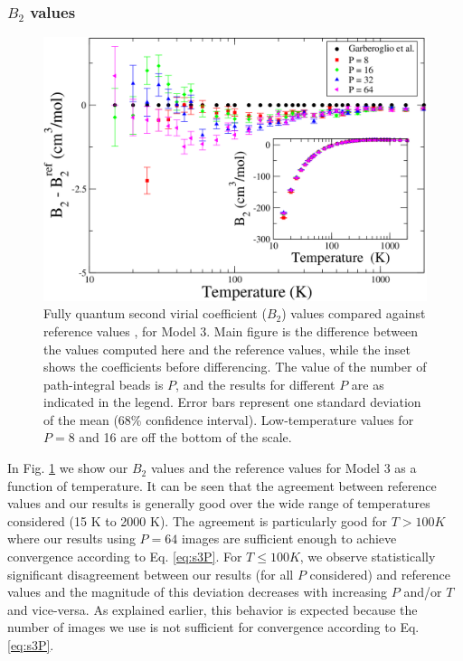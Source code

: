            \subsubsection{$B_2$ values}
                \begin{figure}[!htbp]
                    \centering
                    \includegraphics[scale=0.20,keepaspectratio]{Chapter-4/Figures/s3GarberoglioAll.png}
                    \caption{Fully quantum second virial coefficient ($B_2$) values compared against reference values \cite{Garberoglio2014}, for Model 3. Main figure is the difference between the values computed here and the reference values, while the inset shows the coefficients before differencing. The value of the number of path-integral beads is $P$, and the results for different $P$ are as indicated in the legend. Error bars represent one standard deviation of the mean (68\% confidence interval). Low-temperature values for $P = 8$ and 16 are off the bottom of the scale.}
                    \label{fig:variable}
                \end{figure}
                
                In Fig. \ref{fig:variable} we show our $B_2$ values and the reference values for Model 3 as a function of temperature. It can be seen that the agreement between reference values and our results is generally good over the wide range of temperatures considered (15 K to 2000 K). The agreement is particularly good for $T > 100 K$ where our results using $P = 64$ images are sufficient enough to achieve convergence according to Eq. \eqref{eq:s3P}. For $T \le 100 K$, we observe statistically significant disagreement between our results (for all $P$ considered) and reference values and the magnitude of this deviation decreases with increasing $P$ and/or $T$ and vice-versa. As explained earlier, this behavior is expected because the number of images we use is not sufficient for convergence according to Eq. \eqref{eq:s3P}.
                
